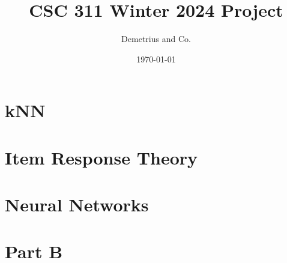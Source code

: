 \documentclass[12pt]{article}
\title{CSC 311 Winter 2024 Project}
\author{Demetrius and Co.}
\date{\today}
\begin{document}
\maketitle

\tableofcontents

\newpage
\section{kNN}
\section{Item Response Theory}
\section{Neural Networks}

\section{Part B}
\end{document}
